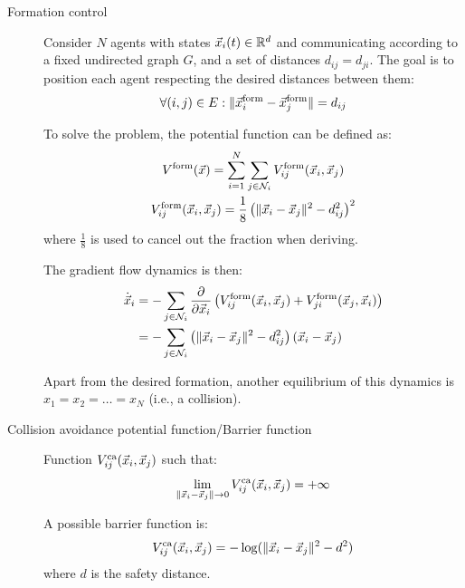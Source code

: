 \begin{description}
    \item[Formation control] 
        Consider $N$ agents with states ${\vec{x}}_i(t) \in \mathbb{R}^d$ and communicating according to a fixed undirected graph $G$, and a set of distances $d_{ij} = d_{ji}$. The goal is to position each agent respecting the desired distances between them:
        \[
            \forall (i,j) \in E: \Vert {\vec{x}}_i^\text{form} - {\vec{x}}_j^\text{form} \Vert = d_{ij}
        \]

        To solve the problem, the potential function can be defined as:
        \[
            \begin{gathered}
                V^\text{form}({\vec{x}}) = \sum_{i=1}^{N} \sum_{j \in \mathcal{N}_i} V_{ij}^\text{form}({\vec{x}}_i, {\vec{x}}_j) \\
                V_{ij}^\text{form}({\vec{x}}_i, {\vec{x}}_j) = \frac{1}{8} \left( \Vert {\vec{x}}_i - {\vec{x}}_j \Vert^2 - d_{ij}^2 \right)^2
            \end{gathered}
        \]
        where $\frac{1}{8}$ is used to cancel out the fraction when deriving.

        The gradient flow dynamics is then:
        \[
            \begin{split}
                \dot{{\vec{x}}}_i &= - \sum_{j \in \mathcal{N}_i} \frac{\partial}{\partial {\vec{x}}_i} \left( V_{ij}^\text{form}({\vec{x}}_i, {\vec{x}}_j) + V_{ji}^\text{form}({\vec{x}}_j, {\vec{x}}_i) \right) \\
                &= - \sum_{j \in \mathcal{N}_i} \left( \Vert {\vec{x}}_i - {\vec{x}}_j \Vert^2 - d_{ij}^2 \right)({\vec{x}}_i - {\vec{x}}_j)
            \end{split}
        \]

        \begin{remark}
            Apart from the desired formation, another equilibrium of this dynamics is $x_1 = x_2 = \dots = x_N$ (i.e., a collision).
        \end{remark}

    \item[Collision avoidance potential function/Barrier function] 
        Function $V_{ij}^\text{ca}({\vec{x}}_i, {\vec{x}}_j)$ such that:
        \[
            \lim_{\Vert {\vec{x}}_i - {\vec{x}}_j \Vert \rightarrow 0} V_{ij}^\text{ca}({\vec{x}}_i, {\vec{x}}_j) = +\infty
        \]

        \begin{remark}
            A possible barrier function is:
            \[
                V_{ij}^\text{ca}({\vec{x}}_i, {\vec{x}}_j) = - \log( \Vert {\vec{x}}_i - {\vec{x}}_j \Vert^2 - d^2 )
            \]
            where $d$ is the safety distance.
        \end{remark}


\end{description}
